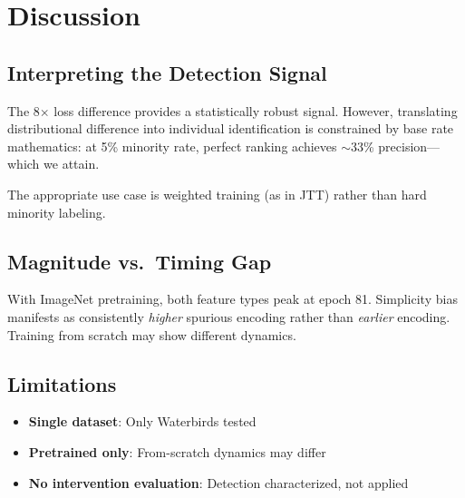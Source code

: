 \section{Discussion}

\subsection{Interpreting the Detection Signal}

The 8$\times$ loss difference provides a statistically robust signal. However, translating distributional difference into individual identification is constrained by base rate mathematics: at 5\% minority rate, perfect ranking achieves $\sim$33\% precision---which we attain.

The appropriate use case is weighted training (as in JTT) rather than hard minority labeling.

\subsection{Magnitude vs.\ Timing Gap}

With ImageNet pretraining, both feature types peak at epoch 81. Simplicity bias manifests as consistently \emph{higher} spurious encoding rather than \emph{earlier} encoding. Training from scratch may show different dynamics.

\subsection{Limitations}

\begin{itemize}
    \item \textbf{Single dataset}: Only Waterbirds tested
    \item \textbf{Pretrained only}: From-scratch dynamics may differ
    \item \textbf{No intervention evaluation}: Detection characterized, not applied
\end{itemize}
